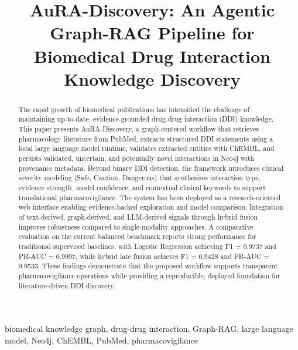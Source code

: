 \documentclass[conference]{Template/IEEEtran}
\begin{document}
\title{AuRA-Discovery: An Agentic Graph-RAG Pipeline for Biomedical Drug Interaction Knowledge Discovery}

\author{
}

\maketitle

\begin{abstract}
The rapid growth of biomedical publications has intensified the challenge of maintaining up-to-date, evidence-grounded drug-drug interaction (DDI) knowledge. This paper presents AuRA-Discovery, a graph-centered workflow that retrieves pharmacology literature from PubMed, extracts structured DDI statements using a local large language model runtime, validates extracted entities with ChEMBL, and persists validated, uncertain, and potentially novel interactions in Neo4j with provenance metadata. Beyond binary DDI detection, the framework introduces clinical severity modeling (Safe, Caution, Dangerous) that synthesizes interaction type, evidence strength, model confidence, and contextual clinical keywords to support translational pharmacovigilance. The system has been deployed as a research-oriented web interface enabling evidence-backed exploration and model comparison. Integration of text-derived, graph-derived, and LLM-derived signals through hybrid fusion improves robustness compared to single-modality approaches. A comparative evaluation on the current balanced benchmark reports strong performance for traditional supervised baselines, with Logistic Regression achieving F1 = 0.9737 and PR-AUC = 0.9997, while hybrid late fusion achieves F1 = 0.9428 and PR-AUC = 0.9533. These findings demonstrate that the proposed workflow supports transparent pharmacovigilance operations while providing a reproducible, deployed foundation for literature-driven DDI discovery.
\end{abstract}

\begin{IEEEkeywords}
biomedical knowledge graph, drug-drug interaction, Graph-RAG, large language model, Neo4j, ChEMBL, PubMed, pharmacovigilance
\end{IEEEkeywords}
\end{document}
